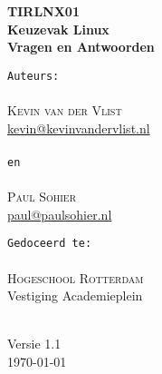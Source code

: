 \documentclass[a4paper,11pt]{exam}
\begin{document}
\begin{titlepage}
\vspace*{\fill}
\begin{center}

\textsc{\Huge \bfseries TIRLNX01}\\[0.5cm]
{\large \bfseries Keuzevak Linux}\\[0.25cm]
{\large \bfseries Vragen en Antwoorden}\\[1.5cm]


\begin{minipage}{0.4\textwidth}
\begin{flushleft} \large
\texttt{Auteurs:}\\
\ \\
\textsc{Kevin van der Vlist}\\
\href{mailto:kevin@kevinvandervlist.nl}{kevin@kevinvandervlist.nl}\\
\ \\
\texttt{en}\\
\ \\
\textsc{Paul Sohier}\\
\href{mailto:paul@paulsohier.nl}{paul@paulsohier.nl}
\end{flushleft}
\end{minipage}
\begin{minipage}{0.5\textwidth}

\begin{flushright} \large
\texttt{Gedoceerd te:}\\
\ \\
\textsc{Hogeschool Rotterdam}\\
Vestiging Academieplein
\end{flushright}
\end{minipage}
{\ }\\[1.5cm]
{\large Versie 1.1}\\[0.75cm]
{\large \today}
\vfill
\end{center}
\vspace*{\fill}
\end{titlepage}

\thispagestyle{empty}

\clearpage
\end{document}
